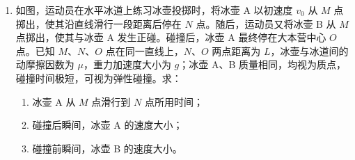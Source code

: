 \documentclass[\gkver]{gaokaozhenti}
\begin{document}
\begin{enumerate}
{（3）为保护电表，量程选择应遵循由大到小的原则。选择开关和指针位置见题图~\ref{2026福建13b}，为交流 $10\UV$ 挡，最小刻度为 $0.2\UV$，读出 $U_2=3.9\UV$。经计算，$\frac{U_2}{U_1}$ 明显小于 $\frac{N_2}{N_1}$，主要原因是漏磁。

（4）用直线拟合数据，使各数据点尽可能靠近直线，并大致均匀地分布在直线两侧，连线见题图。

（5）由所绘图线可知，在测量范围内，$\mathrm{L}_2$ 两端电压 $U_2$ 与其位移 $x$ 成线性关系。
}

\item
如图，运动员在水平冰道上练习冰壶投掷时，将冰壶 A 以初速度 $v_0$ 从 $M$ 点掷出，使其沿直线滑行一段距离后停在 $N$ 点。随后，运动员又将冰壶 B 从 $M$ 点掷出，使其与冰壶 A 发生正碰。碰撞后，冰壶 A 最终停在大本营中心 $O$ 点。已知 $M$、$N$、$O$ 点在同一直线上，$N$、$O$ 两点距离为 $L$，冰壶与冰道间的动摩擦因数为 $\mu$，重力加速度大小为 $g$；冰壶 A、B 质量相同，均视为质点，碰撞时间极短，可视为弹性碰撞。求：
\begin{enumerate}
	\item
	冰壶 A 从 $M$ 点滑行到 $N$ 点所用时间；
	\item
	碰撞后瞬间，冰壶 A 的速度大小；
	\item
	碰撞前瞬间，冰壶 B 的速度大小。
\end{enumerate}


\end{enumerate}
\end{document}
